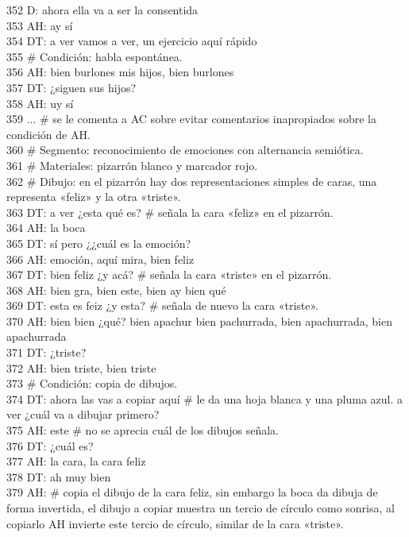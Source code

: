 352 D: ahora ella va a ser la consentida\\
353 AH: ay sí\\
354 DT: a ver vamos a ver, un ejercicio aquí rápido\\
355 \# Condición: habla espontánea.\\
356 AH: bien burlones mis hijos, bien burlones\\
357 DT: ¿siguen sus hijos?\\
358 AH: uy sí\\
359 ... \# se le comenta a AC sobre evitar comentarios inapropiados sobre la condición de AH.\\
360 \# Segmento: reconocimiento de emociones con alternancia semiótica.\\
361 \# Materiales: pizarrón blanco y marcador rojo.\\
362 \# Dibujo: en el pizarrón hay dos representaciones simples de caras, una representa «feliz» y la otra «triste».\\
363 DT: a ver ¿esta qué es? \# señala la cara «feliz» en el pizarrón.\\
364 AH: la boca\\
365 DT: sí pero ¿¿cuál es la emoción?\\
366 AH: emoción, aquí mira, bien feliz\\
367 DT: bien feliz ¿y acá? \# señala la cara «triste» en el pizarrón.\\
368 AH: bien gra, bien este, bien ay bien qué\\
369 DT: esta es feiz ¿y esta? \# señala de nuevo la cara «triste».\\
370 AH: bien bien ¿qué? bien apachur bien pachurrada, bien apachurrada, bien apachurrada\\
371 DT: ¿triste?\\
372 AH: bien triste, bien triste\\
373 \# Condición: copia de dibujos.\\
374 DT: ahora las vas a copiar aquí \# le da una hoja blanca y una pluma azul. a ver ¿cuál va a dibujar primero?\\
375 AH: este \# no se aprecia cuál de los dibujos señala.\\
376 DT: ¿cuál es?\\
377 AH: la cara, la cara feliz\\
378 DT: ah muy bien\\
379 AH: \# copia el dibujo de la cara feliz, sin embargo la boca da dibuja de forma invertida, el dibujo a copiar muestra un tercio de círculo como sonrisa, al copiarlo AH invierte este tercio de círculo, similar de la cara «triste».\\
